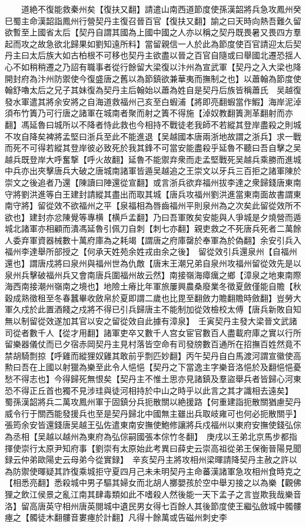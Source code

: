 　　道絶不復能救秦州矣【復扶又翻】請遣山南西道節度使孫漢韶將兵急攻鳳州癸巳蜀主命漢韶詣鳳州行營契丹主復召晉百官【復扶又翻】諭之曰天時向熱吾難久留欲暫至上國省太后【契丹自謂其國為上國中國之人亦以稱之契丹既畏暑又畏四方羣起而攻之故急欲北歸果如劉知遠所料】當留親信一人於此為節度使百官請迎太后契丹主曰太后族大如古柏根不可移也契丹主欲盡以晉之百官自隨或曰舉國北遷恐揺人心不如稍稍遷之乃詔有職事者從行餘留大梁復以汴州為宣武軍【契丹之入大梁也降開封府為汴州防禦使今復盛唐之舊以為節鎮欲兼華夷而撫制之也】以蕭翰為節度使翰舒嚕太后之兄子其妹復為契丹主后翰始以蕭為姓自是契丹后族皆稱蕭氏　吴越復發水軍遣其將余安將之自海道救福州己亥至白蝦浦【將即亮翻蝦當作鰕】海岸泥淖須布竹簀乃可行唐之諸軍在城南者聚而射之簀不得施【淖奴教翻簀測革翻射而亦翻】馮延魯曰城所以不降者恃此救也今相持不戰徒老我師不若縱其登岸盡殺之則城不攻自降矣裨將孟堅曰浙兵至此不能進退【吴越國本唐兩浙地故謂之浙兵】求一戰而死不可得若縱其登岸彼必致死於我其鋒不可當安能盡殺乎延魯不聽曰吾自擊之吴越兵既登岸大呼奮撃【呼火故翻】延魯不能禦弃衆而走孟堅戰死吴越兵乘勝而進城中兵亦出夾擊唐兵大破之唐城南諸軍皆遁吴越追之王崇文以牙兵三百拒之諸軍陳於崇文之後追者乃還【陳讀曰陣還從宣翻】或言浙兵欲弃福州拔李達之衆歸錢唐東南守將劉洪進等白王建封請縱其盡出而取其城【唐兵攻福州劉洪進當東南面故書謂東南守將】留從效不欲福州之平【泉福相為唇齒福州平則泉州為之次矣此留從效所不欲也】建封亦忿陳覺等專横【横戶孟翻】乃曰吾軍敗矣安能與人爭城是夕燒營而遁城北諸軍亦相顧而潰馮延魯引佩刀自刺【刺七亦翻】親吏救之不死唐兵死者二萬餘人委弃軍資器械數十萬府庫為之耗竭【謂唐之府庫罄於奉軍為於偽翻】余安引兵入福州李達舉所部授之【何承天姓苑余姓戎由余之後】　留從效引兵還泉州【自福州還也】謂唐戍將曰泉州與福州世為仇敵【唐末王潮兄弟自泉州攻福州留從效先是以泉州兵擊破福州兵又會南唐兵圍福州故云然】南接嶺海瘴癘之鄉【漳泉之地東南際海西南接潮州嶺南之境也】地險土瘠比年軍旅屢興農桑廢業冬徵夏斂僅能自贍【秋穀成熟徵租至冬春蠶畢收斂帛於夏即謂二歲也比毘至翻斂力贍翻贍時斂翻】豈勞大軍久戍於此置酒餞之戍將不得已引兵歸唐主不能制加從效檢校太傅【唐兵新敗自知無以制留從效遂加其官以安之留從效自此據有漳泉】　壬寅契丹主發大梁晉文武諸司從者數千人【從才用翻】諸軍吏卒又數千人宫女宦官數百人盡載府庫之實以行所留樂器儀仗而已夕宿赤岡契丹主見村落皆空命有司發牓數百通所在招撫百姓然竟不禁胡騎剽掠【呼雞而縱狸奴雞其敢前乎剽匹妙翻】丙午契丹自白馬渡河謂宣徽使高勲曰吾在上國以射獵為樂至此令人悒悒【契丹之下當逸主字樂音洛悒於及翻悒悒憂愁不得志也】今得歸死無恨矣【契丹主不惟土思亦見諸鎮及羣盜舉兵者皆歸心河東恐不得正丘首也獨不見涉珪與徒河相持於中山之時乎以此言之其才識相去遠矣】　蜀孫漢韶將兵二萬攻鳳州軍于固鎮分兵扼散關以絶援路【何重建詣扼散關猶慮契丹威令行于關西能發援兵也至是契丹歸北中國無主雖出兵取岐雍可也何必扼散關乎】　張筠余安皆還錢唐吴越王弘佐遣東南安撫使鮑修讓將兵戍福州以東府安撫使錢弘倧為丞相【吴越以越州為東府為弘倧嗣國張本倧竹冬翻】　庚戌以王弟北京馬步都指揮使崇行太原尹知府事【劉崇有太原始此考異曰薛史云崇高祖從弟王保衡晉陽見聞録云仲弟歐陽史云母弟今從實録】　辛亥契丹主將攻相州梁暉請降契丹主赦之許以為防禦使暉疑其詐復乘城拒守夏四月己未未明契丹主命蕃漢諸軍急攻相州食時克之【相悉亮翻】悉殺城中男子驅其婦女而北胡人擲嬰孩於空中舉刃接之以為樂【觀佛狸之飲江侯景之亂江南其肆毒類如此不嗜殺人然後能一天下孟子之言豈欺我哉樂音洛】留高唐英守相州唐英閱城中遺民男女得七百餘人其後節度使王繼弘斂城中髑髏瘞之【髑徒木翻髏音婁瘞於計翻】凡得十餘萬或告磁州刺史李